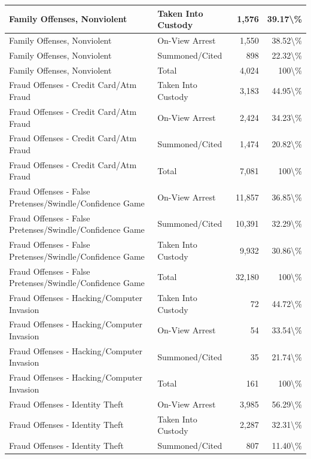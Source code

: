 \documentclass[
]{krantz}
\begin{document}
\begin{longtable}[t]{l|l|r|r}
\hline
Family Offenses, Nonviolent & Taken Into Custody & 1,576 & 39.17\textbackslash{}\%\\
\hline
Family Offenses, Nonviolent & On-View Arrest & 1,550 & 38.52\textbackslash{}\%\\
\hline
Family Offenses, Nonviolent & Summoned/Cited & 898 & 22.32\textbackslash{}\%\\
\hline
Family Offenses, Nonviolent & Total & 4,024 & 100\textbackslash{}\%\\
\hline
Fraud Offenses - Credit Card/Atm Fraud & Taken Into Custody & 3,183 & 44.95\textbackslash{}\%\\
\hline
Fraud Offenses - Credit Card/Atm Fraud & On-View Arrest & 2,424 & 34.23\textbackslash{}\%\\
\hline
Fraud Offenses - Credit Card/Atm Fraud & Summoned/Cited & 1,474 & 20.82\textbackslash{}\%\\
\hline
Fraud Offenses - Credit Card/Atm Fraud & Total & 7,081 & 100\textbackslash{}\%\\
\hline
Fraud Offenses - False Pretenses/Swindle/Confidence Game & On-View Arrest & 11,857 & 36.85\textbackslash{}\%\\
\hline
Fraud Offenses - False Pretenses/Swindle/Confidence Game & Summoned/Cited & 10,391 & 32.29\textbackslash{}\%\\
\hline
Fraud Offenses - False Pretenses/Swindle/Confidence Game & Taken Into Custody & 9,932 & 30.86\textbackslash{}\%\\
\hline
Fraud Offenses - False Pretenses/Swindle/Confidence Game & Total & 32,180 & 100\textbackslash{}\%\\
\hline
Fraud Offenses - Hacking/Computer Invasion & Taken Into Custody & 72 & 44.72\textbackslash{}\%\\
\hline
Fraud Offenses - Hacking/Computer Invasion & On-View Arrest & 54 & 33.54\textbackslash{}\%\\
\hline
Fraud Offenses - Hacking/Computer Invasion & Summoned/Cited & 35 & 21.74\textbackslash{}\%\\
\hline
Fraud Offenses - Hacking/Computer Invasion & Total & 161 & 100\textbackslash{}\%\\
\hline
Fraud Offenses - Identity Theft & On-View Arrest & 3,985 & 56.29\textbackslash{}\%\\
\hline
Fraud Offenses - Identity Theft & Taken Into Custody & 2,287 & 32.31\textbackslash{}\%\\
\hline
Fraud Offenses - Identity Theft & Summoned/Cited & 807 & 11.40\textbackslash{}\%\\

\end{longtable}
\end{document}
